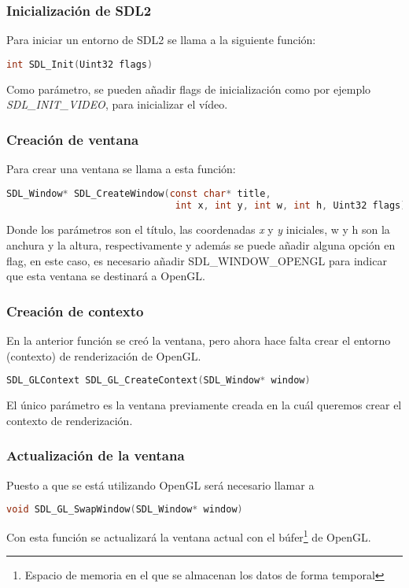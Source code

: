\subsubsection{Inicialización de SDL2}
Para iniciar un entorno de SDL2 se llama a la siguiente función:
\begin{lstlisting}[language=C]
  int SDL_Init(Uint32 flags)
\end{lstlisting}
Como parámetro, se pueden añadir flags de inicialización como por ejemplo
\textit{SDL\_INIT\_VIDEO}, para inicializar el vídeo.

\subsubsection{Creación de ventana}
Para crear una ventana se llama a esta función:
\begin{lstlisting}[language=C]
  SDL_Window* SDL_CreateWindow(const char* title,
                              int x, int y, int w, int h, Uint32 flags)
\end{lstlisting}
Donde los parámetros son el título, las coordenadas \textit{x} y \textit{y} iniciales, w y h son la anchura y la altura, respectivamente y además se puede añadir alguna opción en flag, en este caso, es necesario añadir SDL\_WINDOW\_OPENGL para indicar que esta ventana se destinará a OpenGL.

\subsubsection{Creación de contexto}
En la anterior función se creó la ventana, pero ahora hace falta crear el entorno (contexto) de renderización de OpenGL.
\begin{lstlisting}[language=C]
  SDL_GLContext SDL_GL_CreateContext(SDL_Window* window)
\end{lstlisting}
El único parámetro es la ventana previamente creada en la cuál queremos crear el contexto de renderización.

\subsubsection{Actualización de la ventana}
Puesto a que se está utilizando OpenGL será necesario llamar a
\begin{lstlisting}[language=C]
  void SDL_GL_SwapWindow(SDL_Window* window)
\end{lstlisting}
Con esta función se actualizará la ventana actual con el búfer\footnote{Espacio de memoria en el que se almacenan los datos de forma temporal} de OpenGL.

